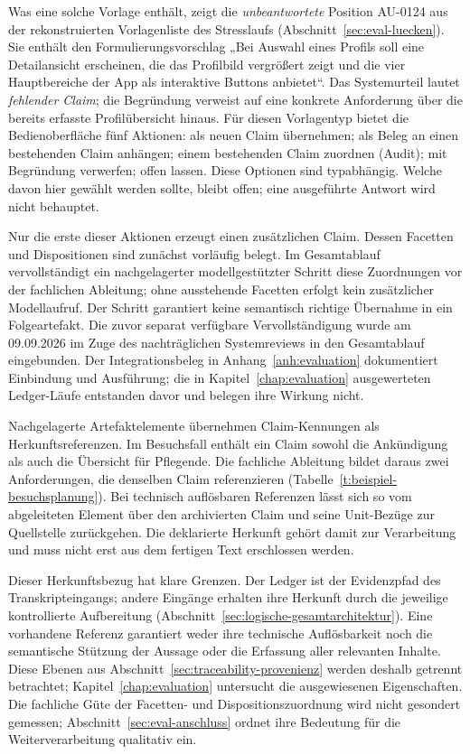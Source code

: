 Was eine solche Vorlage enthält, zeigt die \emph{unbeantwortete}
Position AU-0124 aus der rekonstruierten Vorlagenliste des
Stresslaufs (Abschnitt~\ref{sec:eval-luecken}). Sie enthält den
Formulierungsvorschlag „Bei Auswahl eines Profils soll eine
Detailansicht erscheinen, die das Profilbild vergrößert zeigt und
die vier Hauptbereiche der App als interaktive Buttons anbietet``.
Das Systemurteil lautet \emph{fehlender Claim}; die Begründung
verweist auf eine konkrete Anforderung über die bereits erfasste
Profilübersicht hinaus. Für diesen Vorlagentyp bietet die
Bedienoberfläche fünf Aktionen: als neuen Claim übernehmen; als
Beleg an einen bestehenden Claim anhängen; einem bestehenden Claim
zuordnen (Audit); mit Begründung verwerfen; offen lassen. Diese
Optionen sind typabhängig. Welche davon hier gewählt werden sollte,
bleibt offen; eine ausgeführte Antwort wird nicht behauptet.

Nur die erste dieser Aktionen erzeugt einen zusätzlichen Claim.
Dessen Facetten und Dispositionen sind zunächst vorläufig belegt.
Im Gesamtablauf vervollständigt ein nachgelagerter modellgestützter
Schritt diese Zuordnungen vor der fachlichen Ableitung; ohne
ausstehende Facetten erfolgt kein zusätzlicher Modellaufruf.
Der Schritt garantiert keine semantisch richtige Übernahme in ein
Folgeartefakt. Die zuvor separat verfügbare Vervollständigung wurde
am 09.09.2026 im Zuge des nachträglichen Systemreviews in den
Gesamtablauf eingebunden. Der Integrationsbeleg in
Anhang~\ref{anh:evaluation} dokumentiert Einbindung und Ausführung;
die in Kapitel~\ref{chap:evaluation} ausgewerteten Ledger-Läufe
entstanden davor und belegen ihre Wirkung nicht.

Nachgelagerte Artefaktelemente übernehmen Claim-Kennungen als
Herkunftsreferenzen. Im Besuchsfall enthält ein Claim sowohl die
Ankündigung als auch die Übersicht für Pflegende. Die fachliche
Ableitung bildet daraus zwei Anforderungen, die denselben Claim
referenzieren (Tabelle~\ref{t:beispiel-besuchsplanung}). Bei
technisch auflösbaren Referenzen lässt sich so vom abgeleiteten
Element über den archivierten Claim und seine Unit-Bezüge zur
Quellstelle zurückgehen. Die deklarierte Herkunft gehört damit zur
Verarbeitung und muss nicht erst aus dem fertigen Text erschlossen
werden.

Dieser Herkunftsbezug hat klare Grenzen. Der Ledger ist der
Evidenzpfad des Transkripteingangs; andere Eingänge erhalten ihre
Herkunft durch die jeweilige kontrollierte Aufbereitung
(Abschnitt~\ref{sec:logische-gesamtarchitektur}). Eine vorhandene
Referenz garantiert weder ihre technische Auflösbarkeit noch die
semantische Stützung der Aussage oder die Erfassung aller relevanten
Inhalte. Diese Ebenen aus Abschnitt~\ref{sec:traceability-provenienz}
werden deshalb getrennt betrachtet; Kapitel~\ref{chap:evaluation}
untersucht die ausgewiesenen Eigenschaften. Die fachliche Güte der
Facetten- und Dispositionszuordnung wird nicht gesondert gemessen;
Abschnitt~\ref{sec:eval-anschluss} ordnet ihre Bedeutung für die
Weiterverarbeitung qualitativ ein.


